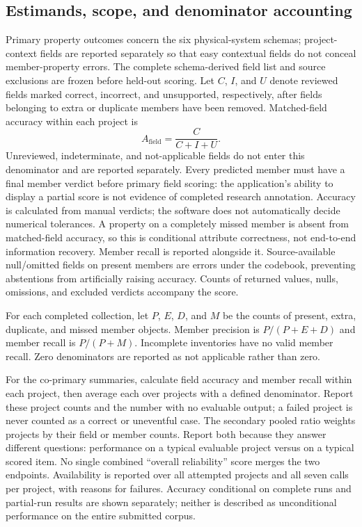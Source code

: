\documentclass[11pt]{article}
\begin{document}
\subsection{Estimands, scope, and denominator accounting}
Primary property outcomes concern the six physical-system schemas; project-context fields are reported separately so that easy contextual fields do not conceal member-property errors. The complete schema-derived field list and source exclusions are frozen before held-out scoring. Let $C$, $I$, and $U$ denote reviewed fields marked correct, incorrect, and unsupported, respectively, after fields belonging to extra or duplicate members have been removed. Matched-field accuracy within each project is
\begin{equation}
 A_{\mathrm{field}}=\frac{C}{C+I+U}.
\end{equation}
Unreviewed, indeterminate, and not-applicable fields do not enter this denominator and are reported separately. Every predicted member must have a final member verdict before primary field scoring: the application's ability to display a partial score is not evidence of completed research annotation. Accuracy is calculated from manual verdicts; the software does not automatically decide numerical tolerances. A property on a completely missed member is absent from matched-field accuracy, so this is conditional attribute correctness, not end-to-end information recovery. Member recall is reported alongside it. Source-available null/omitted fields on present members are errors under the codebook, preventing abstentions from artificially raising accuracy. Counts of returned values, nulls, omissions, and excluded verdicts accompany the score.

For each completed collection, let $P$, $E$, $D$, and $M$ be the counts of present, extra, duplicate, and missed member objects. Member precision is $P/(P+E+D)$ and member recall is $P/(P+M)$. Incomplete inventories have no valid member recall. Zero denominators are reported as not applicable rather than zero.

For the co-primary summaries, calculate field accuracy and member recall within each project, then average each over projects with a defined denominator. Report these project counts and the number with no evaluable output; a failed project is never counted as a correct or uneventful case. The secondary pooled ratio weights projects by their field or member counts. Report both because they answer different questions: performance on a typical evaluable project versus on a typical scored item. No single combined ``overall reliability'' score merges the two endpoints. Availability is reported over all attempted projects and all seven calls per project, with reasons for failures. Accuracy conditional on complete runs and partial-run results are shown separately; neither is described as unconditional performance on the entire submitted corpus.
\end{document}
